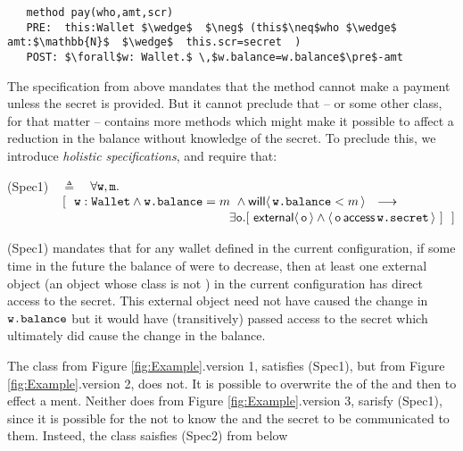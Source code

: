 \begin{lstlisting}
   method pay(who,amt,scr)
   PRE:  this:Wallet $\wedge$  $\neg$ (this$\neq$who $\wedge$ amt:$\mathbb{N}$  $\wedge$  this.scr=secret  )
   POST: $\forall$w: Wallet.$ \,$w.balance=w.balance$\pre$-amt 
 \end{lstlisting}
\vspace{-.2in}
The specification from above mandates that the method  cannot make a payment unless the secret is
provided. But it cannot preclude that  -- or some other class, for that matter -- contains more methods 
which might make it possible to affect a reduction in the balance   without knowledge of the
secret. To preclude this, we introduce \emph{holistic specifications}, and require that:

\vspace{.02in}
(Spec1)\ \  $\triangleq$\ \ $\forall {\mbox{\tt{w}}},{\mbox{\tt{m}}}.$\\
$\strut \hspace{.6in} [\ \ \prg{w}:\prg{Wallet} \wedge \prg{w.balance}=m\ \wedge \Future{\prg{w.balance}<m} \ \    
    \longrightarrow \hfill $ \\
  $ \strut \hspace{6.3cm} 
  \exists \prg{o}. [\  \External{\prg{o}} \wedge  \CanAccess{\prg{o}}{\prg{w.secret}}\ ]  \  \ ] \hfill $
\vspace{.02in}

(Spec1) mandates that for any wallet  defined in the current configuration, if some time in the future the balance of
\prg{w} were to decrease, then at least one external object (\ie an object whose class is not \prg{Wallet}) in the current configuration
has direct access to the secret. This external object need not have caused the change in ${\mbox{\tt{w.balance}}}$ but it would  have (transitively) passed access to the secret which ultimately did cause the change in the balance.

The class  from Figure \ref{fig:Example}.version 1, satisfies (Spec1), but  from Figure \ref{fig:Example}.version 2, does not.
It is possible to overwrite the \prg{secret} of the \prg{Wallet} and then to effect a \prg{pay}ment. Neither does \prg{Wallet} from Figure \ref{fig:Example}.version 3,  sarisfy (Spec1), since it is possible for the  not to know the  and the secret to be 
communicated to them. Insteed, the class saisfies (Spec2) from below
 

